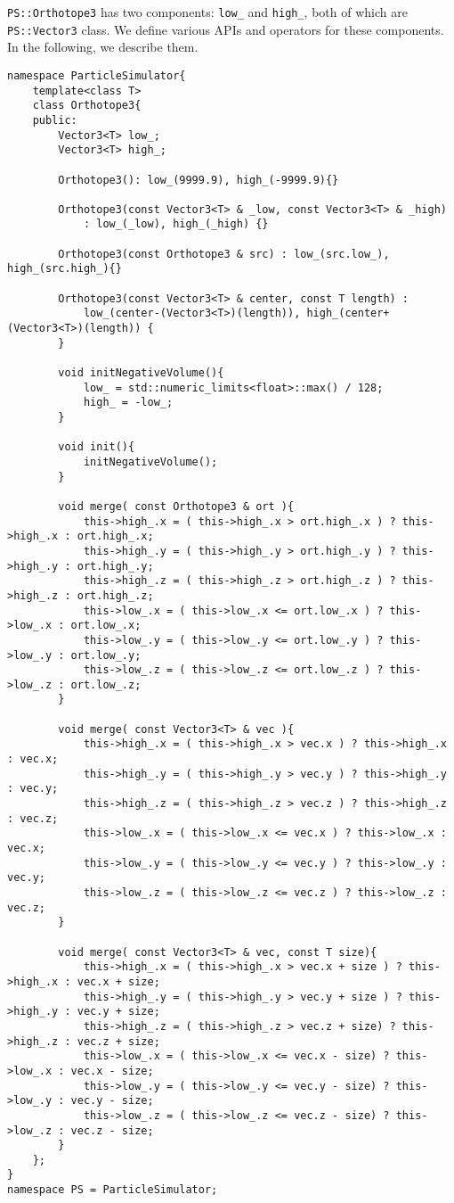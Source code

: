 \texttt{PS::Orthotope3} has two components: \texttt{low\_} and \texttt{high\_}, both of which are \texttt{PS::Vector3} class.
We define various APIs and operators for these components.
In the following, we describe them.

\begin{lstlisting}[caption=Orthotope3]
namespace ParticleSimulator{
    template<class T>
    class Orthotope3{
    public:
        Vector3<T> low_;
        Vector3<T> high_;

        Orthotope3(): low_(9999.9), high_(-9999.9){}

        Orthotope3(const Vector3<T> & _low, const Vector3<T> & _high)
            : low_(_low), high_(_high) {}

        Orthotope3(const Orthotope3 & src) : low_(src.low_), high_(src.high_){}

        Orthotope3(const Vector3<T> & center, const T length) :
            low_(center-(Vector3<T>)(length)), high_(center+(Vector3<T>)(length)) {
        }

        void initNegativeVolume(){
            low_ = std::numeric_limits<float>::max() / 128;
            high_ = -low_;
        }

        void init(){
            initNegativeVolume();
        }

        void merge( const Orthotope3 & ort ){
            this->high_.x = ( this->high_.x > ort.high_.x ) ? this->high_.x : ort.high_.x;
            this->high_.y = ( this->high_.y > ort.high_.y ) ? this->high_.y : ort.high_.y;
            this->high_.z = ( this->high_.z > ort.high_.z ) ? this->high_.z : ort.high_.z;
            this->low_.x = ( this->low_.x <= ort.low_.x ) ? this->low_.x : ort.low_.x;
            this->low_.y = ( this->low_.y <= ort.low_.y ) ? this->low_.y : ort.low_.y;
            this->low_.z = ( this->low_.z <= ort.low_.z ) ? this->low_.z : ort.low_.z;
        }

        void merge( const Vector3<T> & vec ){
            this->high_.x = ( this->high_.x > vec.x ) ? this->high_.x : vec.x;
            this->high_.y = ( this->high_.y > vec.y ) ? this->high_.y : vec.y;
            this->high_.z = ( this->high_.z > vec.z ) ? this->high_.z : vec.z;
            this->low_.x = ( this->low_.x <= vec.x ) ? this->low_.x : vec.x;
            this->low_.y = ( this->low_.y <= vec.y ) ? this->low_.y : vec.y;
            this->low_.z = ( this->low_.z <= vec.z ) ? this->low_.z : vec.z;
        }

        void merge( const Vector3<T> & vec, const T size){
            this->high_.x = ( this->high_.x > vec.x + size ) ? this->high_.x : vec.x + size;
            this->high_.y = ( this->high_.y > vec.y + size ) ? this->high_.y : vec.y + size;
            this->high_.z = ( this->high_.z > vec.z + size) ? this->high_.z : vec.z + size;
            this->low_.x = ( this->low_.x <= vec.x - size) ? this->low_.x : vec.x - size;
            this->low_.y = ( this->low_.y <= vec.y - size) ? this->low_.y : vec.y - size;
            this->low_.z = ( this->low_.z <= vec.z - size) ? this->low_.z : vec.z - size;
        }
    };
}
namespace PS = ParticleSimulator;
\end{lstlisting}

